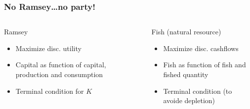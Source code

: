 \documentclass[ps,CFframes_inst]{beamer}
\begin{document}
\begin{frame}
    \frametitle{No Ramsey\ldots no party!} 
    \begin{columns}
	\begin{column}{5cm}
	    \begin{block}{Ramsey}
		\begin{itemize}
		    \item Maximize disc. utility
		
		    \item Capital as function of capital, production 
		    and consumption
		
		    \item Terminal condition for $K$
		\end{itemize}
		\end{block}
		\end{column}
\pause		
	\begin{column}{5cm}
	    \begin{block}{Fish (natural resource)}
		\begin{itemize}
		    \item Maximize disc. cashflows
		
		    \item Fish as function of fish and fished quantity
		
		    \item Terminal condition (to avoide depletion)
		\end{itemize}
		\end{block}
		\end{column}
	\end{columns}

\end{frame}
\end{document}
